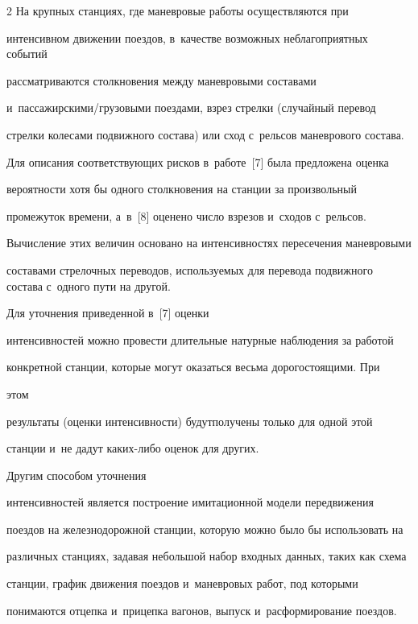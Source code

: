 \begin{multicols}{2}
      На крупных станциях, где маневровые работы осуществляются при 


интенсивном движении поездов, в~качестве возможных неблагоприятных событий 


рассматриваются столкновения между маневровыми составами 


и~пассажирскими/грузовыми поездами, взрез стрелки (случайный перевод 


стрелки колесами подвижного состава) или сход с~рельсов маневрового состава. 


Для описания соответствующих рисков в~работе~[7] была предложена оценка 


вероятности хотя бы одного столкновения на станции за произвольный 


промежуток времени, а~в~[8] оценено число взрезов и~сходов с~рельсов. 


Вычисление этих величин основано на интенсивностях пересечения маневровыми 


составами стрелочных переводов, используемых для перевода подвижного состава с~одного пути на другой. 





Для уточнения приведенной в~[7] оценки 


интенсивностей можно провести длительные натурные наблюдения за работой 


конкретной станции, которые могут оказаться весьма дорогостоящими. При\linebreak


 этом 


результаты (оценки интенсивности) будут\linebreak получены только для одной этой 


станции и~не дадут ка\-ких-ли\-бо оценок для других. 





Другим способом уточнения 


интенсивностей является по\-стро\-ение имитационной модели передвижения 


поездов на железнодорожной станции, которую можно было бы использовать на 


различных станциях, задавая небольшой набор входных данных, таких как схема 


станции, график движения поездов и~маневровых работ, под которыми 


понимаются отцепка и~прицепка вагонов, выпуск и~расформирование поездов. 



\end{multicols}
